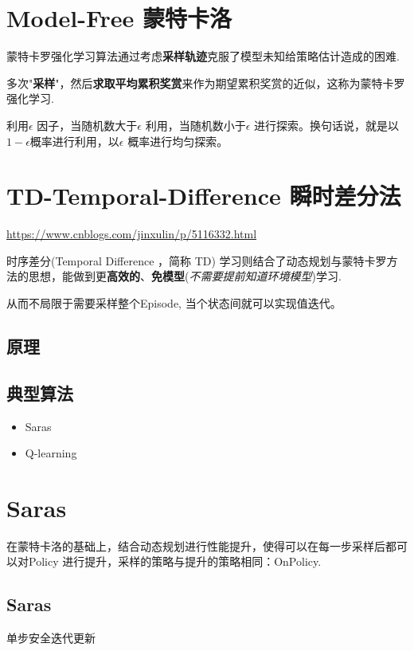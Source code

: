 \documentclass[UTF8,a4paper,12pt]{ctexbook}
\begin{document}
		
	\section{Model-Free 蒙特卡洛}
		蒙特卡罗强化学习算法通过考虑\textbf{采样轨迹}克服了模型未知给策略估计造成的困难.
		
		多次"\textbf{采样}"，然后\textbf{求取平均累积奖赏}来作为期望累积奖赏的近似，这称为蒙特卡罗强化学习.
		
		利用$\epsilon$ 因子，当随机数大于$\epsilon$ 利用，当随机数小于$\epsilon$ 进行探索。换句话说，就是以$1-\epsilon$概率进行利用，以$\epsilon$ 概率进行均匀探索。 
		
		
		
	\section{TD-Temporal-Difference 瞬时差分法}
		\url{https://www.cnblogs.com/jinxulin/p/5116332.html}
		
		时序差分(Temporal Difference ，简称 TD) 学习则结合了动态规划与蒙特卡罗方法的思想，能做到更\textbf{高效的}、\textbf{免模型}(\textit{不需要提前知道环境模型})学习.
		
		从而不局限于需要采样整个Episode, 当个状态间就可以实现值迭代。
		
		\subsection{原理}
			
			
			
		\subsection{典型算法}
			\begin{itemize}
			\item Saras
			\item Q-learning
			\end{itemize}
		
		
	\section{Saras}
		在蒙特卡洛的基础上，结合动态规划进行性能提升，使得可以在每一步采样后都可以对Policy 进行提升，采样的策略与提升的策略相同：OnPolicy.
		
		\subsection{Saras}
			单步安全迭代更新
		
\end{document}
